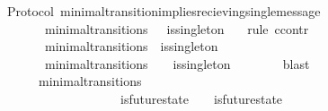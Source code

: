 \begin{isabellebody}
\endisatagproof
{\isafoldproof}%
%
\isadelimproof
\isanewline
%
\endisadelimproof
\isanewline
\isanewline
{}\isamarkupfalse%
\ {\isacharparenleft}\ Protocol{\isacharparenright}\ minimal{\isacharunderscore}transition{\isacharunderscore}implies{\isacharunderscore}recieving{\isacharunderscore}single{\isacharunderscore}message\ {\isacharcolon}\isanewline
\ \ {\isachardoublequoteopen}{\isasymforall}\ {\isasymsigma}\ {\isasymsigma}{\isacharprime}{\isachardot}\ {\isacharparenleft}{\isasymsigma}{\isacharcomma}\ {\isasymsigma}{\isacharprime}{\isacharparenright}\ {\isasymin}\ minimal{\isacharunderscore}transitions\ \ {\isasymlongrightarrow}\ is{\isacharunderscore}singleton\ {\isacharparenleft}{\isasymsigma}{\isacharprime}{\isacharminus}\ {\isasymsigma}{\isacharparenright}{\isachardoublequoteclose}\isanewline
%
\isadelimproof
%
\endisadelimproof
%
\isatagproof
{}\isamarkupfalse%
\ {\isacharparenleft}rule\ ccontr{\isacharparenright}\isanewline
\ \ \isamarkupfalse%
\ {\isachardoublequoteopen}{\isasymnot}\ {\isacharparenleft}{\isasymforall}\ {\isasymsigma}\ {\isasymsigma}{\isacharprime}{\isachardot}\ {\isacharparenleft}{\isasymsigma}{\isacharcomma}\ {\isasymsigma}{\isacharprime}{\isacharparenright}\ {\isasymin}\ minimal{\isacharunderscore}transitions\ {\isasymlongrightarrow}\ is{\isacharunderscore}singleton\ {\isacharparenleft}{\isasymsigma}{\isacharprime}{\isacharminus}\ {\isasymsigma}{\isacharparenright}{\isacharparenright}{\isachardoublequoteclose}\isanewline
\ \ \isamarkupfalse%
\ \isamarkupfalse%
\ \ {\isachardoublequoteopen}{\isasymexists}\ {\isasymsigma}\ {\isasymsigma}{\isacharprime}{\isachardot}\ {\isacharparenleft}{\isasymsigma}{\isacharcomma}\ {\isasymsigma}{\isacharprime}{\isacharparenright}\ {\isasymin}\ minimal{\isacharunderscore}transitions\ {\isasymand}\ {\isasymnot}\ \ is{\isacharunderscore}singleton\ {\isacharparenleft}{\isasymsigma}{\isacharprime}{\isacharminus}\ {\isasymsigma}{\isacharparenright}{\isachardoublequoteclose}\isanewline
\ \ \ \ \isamarkupfalse%
\ blast\isanewline
\ \ \isamarkupfalse%
\ {\isachardoublequoteopen}{\isasymforall}\ {\isasymsigma}\ {\isasymsigma}{\isacharprime}{\isachardot}\ {\isacharparenleft}{\isasymsigma}{\isacharcomma}\ {\isasymsigma}{\isacharprime}{\isacharparenright}\ {\isasymin}\ minimal{\isacharunderscore}transitions\ {\isasymlongrightarrow}\isanewline
\ \ \ \ \ \ \ \ \ \ \ \ \ \ {\isacharparenleft}{\isasymnexists}\ {\isasymsigma}{\isacharprime}{\isacharprime}{\isachardot}\ {\isasymsigma}{\isacharprime}{\isacharprime}\ {\isasymin}\ {\isasymSigma}\ {\isasymand}\ is{\isacharunderscore}future{\isacharunderscore}state\ {\isacharparenleft}{\isasymsigma}{\isacharcomma}\ {\isasymsigma}{\isacharprime}{\isacharprime}{\isacharparenright}\ {\isasymand}\ is{\isacharunderscore}future{\isacharunderscore}state\ {\isacharparenleft}{\isasymsigma}{\isacharprime}{\isacharprime}{\isacharcomma}\ {\isasymsigma}{\isacharprime}{\isacharparenright}\ {\isasymand}\ {\isasymsigma}\ {\isasymnoteq}\ {\isasymsigma}{\isacharprime}{\isacharprime}\ {\isasymand}\ {\isasymsigma}{\isacharprime}{\isacharprime}\ {\isasymnoteq}\ {\isasymsigma}{\isacharprime}{\isacharparenright}{\isachardoublequoteclose}\isanewline

\end{isabellebody}
